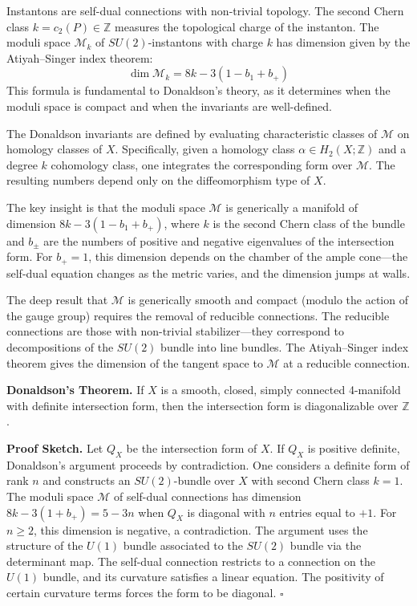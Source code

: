 Instantons are self-dual connections with non-trivial topology. The second Chern class $k = c_2(P) \in \mathbb{Z}$ measures the topological charge of the instanton. The moduli space $\mathcal{M}_k$ of $SU(2)$-instantons with charge $k$ has dimension given by the Atiyah--Singer index theorem:
\[
\dim \mathcal{M}_k = 8k - 3(1 - b_1 + b_+)
\]
This formula is fundamental to Donaldson's theory, as it determines when the moduli space is compact and when the invariants are well-defined.

The Donaldson invariants are defined by evaluating characteristic classes of $\mathcal{M}$ on homology classes of $X$. Specifically, given a homology class $\alpha \in H_2(X;\mathbb{Z})$ and a degree $k$ cohomology class, one integrates the corresponding form over $\mathcal{M}$. The resulting numbers depend only on the diffeomorphism type of $X$.

The key insight is that the moduli space $\mathcal{M}$ is generically a manifold of dimension $8k - 3(1 - b_1 + b_+)$, where $k$ is the second Chern class of the bundle and $b_\pm$ are the numbers of positive and negative eigenvalues of the intersection form. For $b_+ = 1$, this dimension depends on the chamber of the ample cone---the self-dual equation changes as the metric varies, and the dimension jumps at walls.

The deep result that $\mathcal{M}$ is generically smooth and compact (modulo the action of the gauge group) requires the removal of reducible connections. The reducible connections are those with non-trivial stabilizer---they correspond to decompositions of the $SU(2)$ bundle into line bundles. The Atiyah--Singer index theorem gives the dimension of the tangent space to $\mathcal{M}$ at a reducible connection.

\textbf{Donaldson's Theorem.} If $X$ is a smooth, closed, simply connected 4-manifold with definite intersection form, then the intersection form is diagonalizable over $\mathbb{Z}$.

\textbf{Proof Sketch.} Let $Q_X$ be the intersection form of $X$. If $Q_X$ is positive definite, Donaldson's argument proceeds by contradiction. One considers a definite form of rank $n$ and constructs an $SU(2)$-bundle over $X$ with second Chern class $k = 1$. The moduli space $\mathcal{M}$ of self-dual connections has dimension $8k - 3(1+b_+) = 5 - 3n$ when $Q_X$ is diagonal with $n$ entries equal to $+1$. For $n \geq 2$, this dimension is negative, a contradiction. The argument uses the structure of the $U(1)$ bundle associated to the $SU(2)$ bundle via the determinant map. The self-dual connection restricts to a connection on the $U(1)$ bundle, and its curvature satisfies a linear equation. The positivity of certain curvature terms forces the form to be diagonal. $\square$

